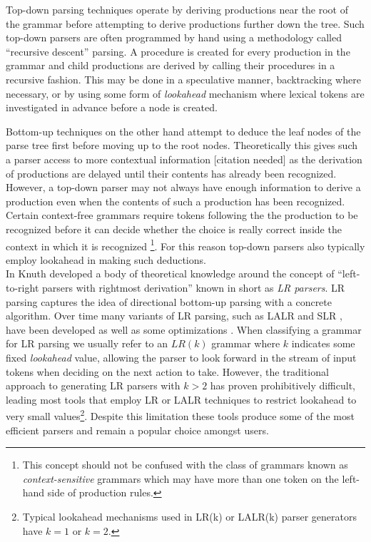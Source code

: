 \documentclass[a4paper,11pt]{article}
\begin{document}
Top-down parsing techniques operate by deriving productions near the root of the grammar before attempting to derive productions further down the tree.
Such top-down parsers are often programmed by hand using a methodology called ``recursive descent'' parsing.
A procedure is created for every production in the grammar and child productions are derived by calling their procedures in a recursive fashion.
This may be done in a speculative manner, backtracking where necessary, or by using some form of \emph{lookahead} mechanism where lexical tokens are investigated in advance before a node is created.

Bottom-up techniques on the other hand attempt to deduce the leaf nodes of the parse tree first before moving up to the root nodes. 
Theoretically this gives such a parser access to more contextual information [citation needed] as the derivation of productions are delayed until their contents has already been recognized.
However, a top-down parser may not always have enough information to derive a production even when the contents of such a production has been recognized. 
Certain context-free grammars require tokens following the the production to be recognized before it can decide whether the choice is really correct inside the context in which it is recognized
\footnote{This concept should not be confused with the class of grammars known as \emph{context-sensitive} grammars which may have more than one token on the left-hand side of production rules.}.
For this reason top-down parsers also typically employ lookahead in making such deductions.\\

In \cite{knuth65} Knuth developed a body of theoretical knowledge around the concept of ``left-to-right parsers with rightmost derivation'' known in short as \emph{LR parsers}. 
LR parsing captures the idea of directional bottom-up parsing with a concrete algorithm.
Over time many variants of LR parsing, such as LALR and SLR \cite{362625}, have been developed as well as some optimizations \cite{13326}.
When classifying a grammar for LR parsing we usually refer to an $LR(k)$ grammar where $k$ indicates some fixed \emph{lookahead} value, allowing the parser to look forward in the stream of input tokens when deciding on the next action to take.
However, the traditional approach to generating LR parsers with $k > 2$ has proven prohibitively difficult, leading most tools that employ LR or LALR techniques to restrict lookahead to very small values\footnote{Typical lookahead mechanisms used in LR(k) or LALR(k) parser generators have $k = 1$ or $k = 2$.}.
Despite this limitation these tools produce some of the most efficient parsers and remain a popular choice amongst users.
\end{document}
